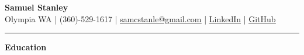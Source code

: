 \documentclass[10pt]{article}
\begin{document}
  \begin{center}
    {\fontsize{20}{20}\selectfont \textbf{Samuel Stanley}}\\[5pt]
    Olympia WA | (360)-529-1617 |
    \href{mailto:samcstanle@gmail.com}{\uline{samcstanle@gmail.com}} |
    \href{https://www.linkedin.com/in/samuel-stanley-1ba48b24a/}{\uline{LinkedIn}} |
    \href{https://github.com/SamStan4}{\uline{GitHub}}
    \rule{\linewidth}{0.4pt}
  \end{center}
  \vspace{-15pt}
  \begin{center}
    {\fontsize{15}{20}\selectfont \textbf{Education}} %
  \end{center}
\end{document}
